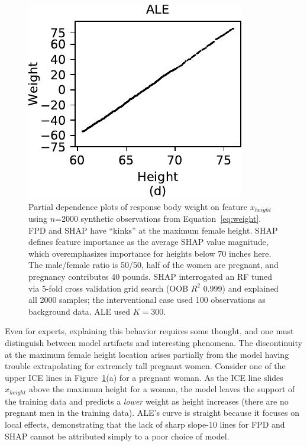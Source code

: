 \documentclass[]{article} %
\renewcommand{\eqref}[1]{Equation~\ref{#1}}
\newcommand{\figref}[1]{Figure~\ref{#1}}
\begin{document}
\begin{figure}[!htbp]
\begin{center}
\includegraphics[scale=0.55]{images/height_ale.pdf}\vspace{-2mm}
\caption{\small Partial dependence plots of response body weight on feature $x_{height}$ using $n$=2000 synthetic observations from \eqref{eq:weight}. FPD and SHAP have ``kinks'' at the maximum female height. SHAP defines feature importance as the average SHAP value magnitude, which overemphasizes importance for heights below 70 inches here. The male/female ratio is 50/50, half of the women are pregnant, and pregnancy contributes 40 pounds. SHAP interrogated an RF tuned via 5-fold cross validation grid search (OOB $R^2$ 0.999) and explained all 2000 samples; the interventional case used 100 observations as background data. ALE used $K=300$.}
\label{fig:heightweight}
\end{center}
\end{figure}

Even for experts, explaining this behavior requires some thought, and one must distinguish between model artifacts and interesting phenomena. The discontinuity at the maximum female height location arises partially from the model having trouble extrapolating for extremely tall pregnant women. Consider one of the upper ICE lines in \figref{fig:heightweight}(a) for a pregnant woman. As the ICE line slides $x_{height}$ above the maximum height for a woman, the model leaves the support of the training data and predicts a {\em lower} weight as height increases (there are no pregnant men in the training data). ALE's curve is straight because it focuses on local effects, demonstrating that the lack of sharp slope-10 lines for FPD and SHAP cannot be attributed simply to a poor choice of model.  
\end{document}
